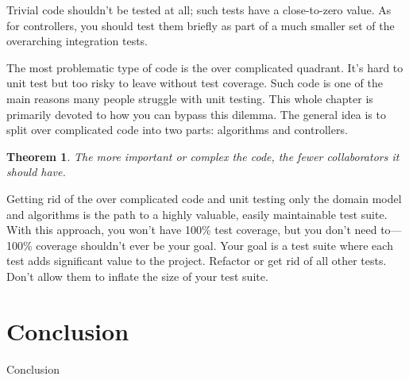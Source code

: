 \documentclass{article}
\newtheorem{theorem}{Theorem}
\begin{document}
Trivial code shouldn’t be tested at all; such tests have a close-to-zero value. As for controllers, you should test them briefly as part of a much smaller set of the overarching integration tests.

The most problematic type of code is the over complicated quadrant. It’s hard to unit test but too risky to leave without test coverage. Such code is one of the main reasons many people struggle with unit testing. This whole chapter is primarily devoted to how you can bypass this dilemma. The general idea is to split over complicated code into two parts: algorithms and controllers.

\begin{theorem}
The more important or complex the code, the fewer collaborators it should have.
\end{theorem}

Getting rid of the over complicated code and unit testing only the domain model and algorithms is the path to a highly valuable, easily maintainable test suite. With this approach, you won’t have 100\% test coverage, but you don’t need to—100\% coverage shouldn’t ever be your goal. Your goal is a test suite where each test adds significant value to the project. Refactor or get rid of all other tests. Don’t allow them to inflate the size of your test suite.

\section{Conclusion}

Conclusion


\newpage

 

\end{document}
